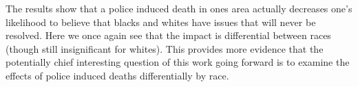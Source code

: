 \documentclass{article}
\begin{document}
\bigskip

The results show that a police induced death in ones area actually decreases one's likelihood to believe that blacks and whites have issues that will never be resolved. Here we once again see that the impact is differential between races (though still insignificant for whites). This provides more evidence that the potentially chief interesting question of this work going forward is to examine the effects of police induced deaths differentially by race.

\pagebreak



\end{document}
